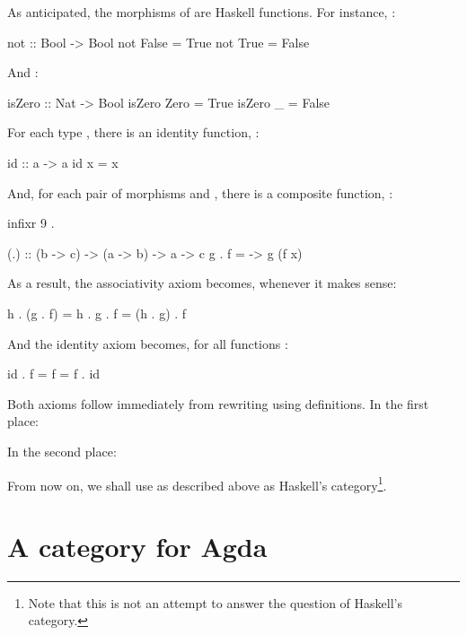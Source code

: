 As anticipated, the morphisms of \hask are Haskell functions. For
instance, :
\begin{codehaskell}
not :: Bool -> Bool
not False = True
not True  = False
\end{codehaskell}
And :
\begin{codehaskell}
isZero :: Nat -> Bool
isZero Zero = True
isZero _    = False
\end{codehaskell}

For each type , there is an identity function,
:
\begin{codehaskell}
id :: a -> a
id x = x
\end{codehaskell}
And, for each pair of morphisms  and
, there is a composite function,
:
\begin{codehaskell}
infixr 9 .

(.) :: (b -> c) -> (a -> b) -> a -> c
g . f = \x -> g (f x)
\end{codehaskell}

As a result, the associativity axiom becomes, whenever it makes sense:
\begin{codehaskell}
h . (g . f) = h . g . f = (h . g) . f
\end{codehaskell}
And the identity axiom becomes, for all functions :
\begin{codehaskell}
id . f = f = f . id
\end{codehaskell}
Both axioms follow immediately from rewriting using definitions. In
the first place:
\begin{steps}
\end{steps}
In the second place:
\begin{steps}
\end{steps}

From now on, we shall use \hask as described above as Haskell's
category\footnote{Note that this is not an attempt to answer the
  question of Haskell's category.}.

\section{A category for Agda}
\label{sec:category-agda}

